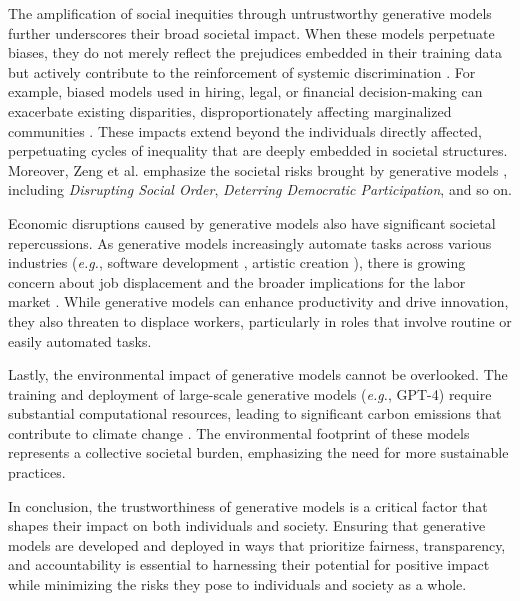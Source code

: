 The amplification of social inequities through untrustworthy generative models further underscores their broad societal impact. When these models perpetuate biases, they do not merely reflect the prejudices embedded in their training data but actively contribute to the reinforcement of systemic discrimination \cite{anderljung2023frontier}. For example, biased models used in hiring, legal, or financial decision-making can exacerbate existing disparities, disproportionately affecting marginalized communities \cite{bukar2024decision}. These impacts extend beyond the individuals directly affected, perpetuating cycles of inequality that are deeply embedded in societal structures. Moreover, Zeng et al. emphasize the societal risks brought by generative models \cite{zeng2024ai}, including \textit{Disrupting Social Order}, \textit{Deterring Democratic Participation}, and so on.

Economic disruptions caused by generative models also have significant societal repercussions. As generative models increasingly automate tasks across various industries (\emph{e.g.}, software development \cite{chatdev}, artistic creation \cite{carrillo2023diffusart, somepalli2023diffusion}), there is growing concern about job displacement and the broader implications for the labor market \cite{Eloundou2023GPTsAG}. While generative models can enhance productivity and drive innovation, they also threaten to displace workers, particularly in roles that involve routine or easily automated tasks. 

Lastly, the environmental impact of generative models cannot be overlooked. The training and deployment of large-scale generative models (\emph{e.g.}, GPT-4) require substantial computational resources, leading to significant carbon emissions that contribute to climate change \cite{li2023making, luccioni2024power}. The environmental footprint of these models represents a collective societal burden, emphasizing the need for more sustainable practices.

In conclusion, the trustworthiness of generative models is a critical factor that shapes their impact on both individuals and society. Ensuring that generative models are developed and deployed in ways that prioritize fairness, transparency, and accountability is essential to harnessing their potential for positive impact while minimizing the risks they pose to individuals and society as a whole.

